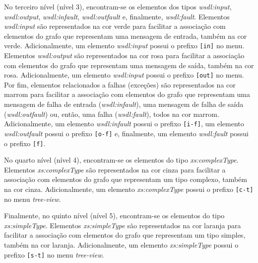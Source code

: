 No terceiro nível (nível 3), encontram-se os elementos dos tipos \textit{wsdl:input}, \textit{wsdl:output}, \textit{wsdl:infault}, \textit{wsdl:outfault} e, finalmente, \textit{wsdl:fault}. Elementos \textit{wsdl:input} são representados na cor verde para facilitar a associação com elementos do grafo que representam uma mensagem de entrada, também na cor verde. Adicionalmente, um elemento \textit{wsdl:input} possui o prefixo \texttt{[in]} no menu. Elementos \textit{wsdl:output} são representados na cor rosa para facilitar a associação com elementos do grafo que representam uma mensagem de saída, também na cor rosa. Adicionalmente, um elemento \textit{wsdl:input} possui o prefixo \texttt{[out]} no menu. Por fim, elementos relacionados a falhas (exceções) são representados na cor marrom para facilitar a associação com elementos do grafo que representam uma mensagem de falha de entrada (\textit{wsdl:infault}), uma mensagem de falha de saída (\textit{wsdl:outfault}) ou, então, uma falha (\textit{wsdl:fault}), todos na cor marrom. Adicionalmente, um elemento \textit{wsdl:infault} possui o prefixo \texttt{[i-f]}, um elemento \textit{wsdl:outfault} possui o prefixo \texttt{[o-f]} e, finalmente, um elemento \textit{wsdl:fault} possui o prefixo \texttt{[f]}.

No quarto nível (nível 4), encontram-se os elementos do tipo \textit{xs:complexType}. Elementos \textit{xs:complexType} são representados na cor cinza para facilitar a associação com elementos do grafo que representam um tipo complexo, também na cor cinza. Adicionalmente, um elemento \textit{xs:complexType} possui o prefixo \texttt{[c-t]} no menu \textit{tree-view}.

Finalmente, no quinto nível (nível 5), encontram-se os elementos do tipo \textit{xs:simpleType}. Elementos \textit{xs:simpleType} são representados na cor laranja para facilitar a associação com elementos do grafo que representam um tipo simples, também na cor laranja. Adicionalmente, um elemento \textit{xs:simpleType} possui o prefixo \texttt{[s-t]} no menu \textit{tree-view}.

